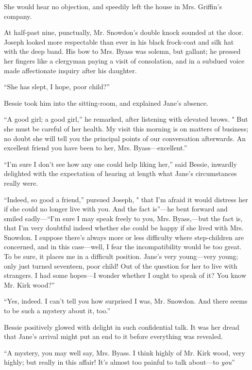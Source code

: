 She would hear no objection, and speedily left the house in Mrs.
Griffin's company.

At half-past nine, punctually, Mr. Snowdon's double knock sounded at the
door. Joseph looked more respectable than ever in his black frock-coat
and silk hat with the deep band. His bow to Mrs. Byass was solemn, but
gallant; he pressed her fingers like a clergyman paying a visit of
consolation, and in a subdued voice made affectionate inquiry after his
daughter.

``She has slept, I hope, poor child?''

Bessie took him into the sitting-room, and explained Jane's absence.

``A good girl; a good girl,'' he remarked, after listening with elevated
brows. " But she must be careful of her health. My visit this morning is
on matters of business; no doubt she will tell you the principal points
of our conversation afterwards. An excellent friend you have been to
her, Mrs. Byass---excellent.''

{\protect\hypertarget{224}{}{}}``I'm sure I don't see how any one could
help liking her,'' said Bessie, inwardly delighted with the expectation
of hearing at length what Jane's circumstances really were.

``Indeed, so good a friend,'' pursued Joseph, " that I'm afraid it would
distress her if she could no longer live with you. And the fact
is''---he bent forward and smiled sadly---``I'm sure I may speak freely
to you, Mrs. Byass,---but the fact is, that I'm very doubtful indeed
whether she could be happy if she lived with Mrs. Snowdon. I suppose
there's always more or less difficulty where step-children are
concerned, and in this case---well, I fear the incompatibility would be
too great. To be sure, it places me in a difficult position. Jane's very
young---very young; only just turned seventeen, poor child! Out of the
question for her to live with strangers. I had some hopes---I wonder
whether I ought to speak of it? You know Mr. Kirk wood?''

``Yes, indeed. I can't tell you how surprised I was, Mr. Snowdon. And
there seems to be such a mystery about it, too.''

Bessie positively glowed with delight in such confidential talk. It was
her dread that {\protect\hypertarget{225}{}{}}Jane's arrival might put
an end to it before everything was revealed.

``A mystery, you may well say, Mrs. Byass. I think highly of Mr. Kirk
wood, very highly; but really in this affair! It's almost too painful to
talk about---to \emph{you}''

